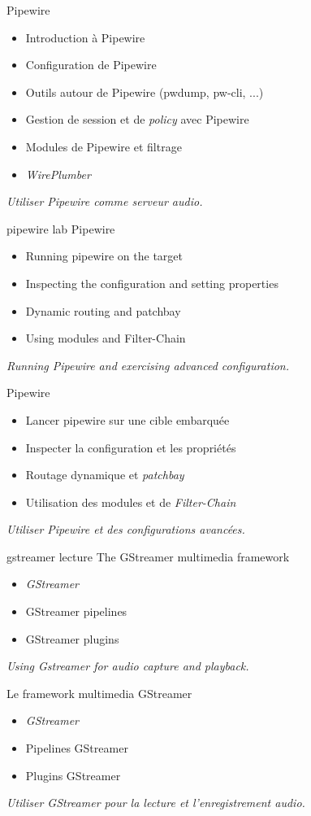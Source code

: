 {Pipewire}
{
  \begin{itemize}
  \item Introduction à Pipewire
  \item Configuration de Pipewire
  \item Outils autour de Pipewire (pwdump, pw-cli, ...)
  \item Gestion de session et de {\em policy} avec Pipewire
  \item Modules de Pipewire et filtrage
  \item {\em WirePlumber}
  \end{itemize}
  \vspace{0.5em}
  {\em Utiliser Pipewire comme serveur audio.}
}
{pipewire}
{lab}
{Pipewire}
{
  \begin{itemize}
  \item Running pipewire on the target
  \item Inspecting the configuration and setting properties
  \item Dynamic routing and patchbay
  \item Using modules and Filter-Chain
  \end{itemize}
  \vspace{0.5em}
  {\em Running Pipewire and exercising advanced configuration.}
}
{Pipewire}
{
  \begin{itemize}
  \item Lancer pipewire sur une cible embarquée
  \item Inspecter la configuration et les propriétés
  \item Routage dynamique et {\em patchbay}
  \item Utilisation des modules et de {\em Filter-Chain}
  \end{itemize}
  \vspace{0.5em}
  {\em Utiliser Pipewire et des configurations avancées.}
}
{gstreamer}
{lecture}
{The GStreamer multimedia framework}
{
  \begin{itemize}
  \item {\em GStreamer}
  \item GStreamer pipelines
  \item GStreamer plugins
  \end{itemize}
  \vspace{0.5em}
  {\em Using Gstreamer for audio capture and playback.}
}
{Le framework multimedia GStreamer}
{
  \begin{itemize}
  \item {\em GStreamer}
  \item Pipelines GStreamer
  \item Plugins GStreamer
  \end{itemize}
  \vspace{0.5em}
  {\em Utiliser GStreamer pour la lecture et l'enregistrement audio.}
}

